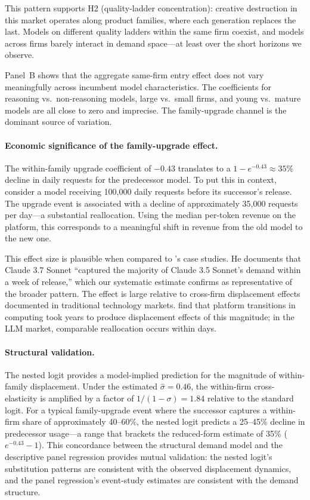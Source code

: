 \documentclass[11pt, a4paper]{article}
\begin{document}
This pattern supports H2 (quality-ladder concentration): creative destruction in this market operates along product families, where each generation replaces the last. Models on different quality ladders within the same firm coexist, and models across firms barely interact in demand space---at least over the short horizons we observe.

Panel~B shows that the aggregate same-firm entry effect does not vary meaningfully across incumbent model characteristics. The coefficients for reasoning vs.\ non-reasoning models, large vs.\ small firms, and young vs.\ mature models are all close to zero and imprecise. The family-upgrade channel is the dominant source of variation.

\paragraph{Economic significance of the family-upgrade effect.} The within-family upgrade coefficient of $-0.43$ translates to a $1 - e^{-0.43} \approx 35\%$ decline in daily requests for the predecessor model. To put this in context, consider a model receiving 100,000 daily requests before its successor's release. The upgrade event is associated with a decline of approximately 35,000 requests per day---a substantial reallocation. Using the median per-token revenue on the platform, this corresponds to a meaningful shift in revenue from the old model to the new one.

This effect size is plausible when compared to \citet{fradkin2025demand}'s case studies. He documents that Claude 3.7 Sonnet ``captured the majority of Claude 3.5 Sonnet's demand within a week of release,'' which our systematic estimate confirms as representative of the broader pattern. The effect is large relative to cross-firm displacement effects documented in traditional technology markets. \citet{bresnahan1999technological} find that platform transitions in computing took years to produce displacement effects of this magnitude; in the LLM market, comparable reallocation occurs within days.

\paragraph{Structural validation.} The nested logit provides a model-implied prediction for the magnitude of within-family displacement. Under the estimated $\hat{\sigma} = 0.46$, the within-firm cross-elasticity is amplified by a factor of $1/(1-\sigma) = 1.84$ relative to the standard logit. For a typical family-upgrade event where the successor captures a within-firm share of approximately 40--60\%, the nested logit predicts a 25--45\% decline in predecessor usage---a range that brackets the reduced-form estimate of 35\% ($e^{-0.43} - 1$). This concordance between the structural demand model and the descriptive panel regression provides mutual validation: the nested logit's substitution patterns are consistent with the observed displacement dynamics, and the panel regression's event-study estimates are consistent with the demand structure.
\end{document}
